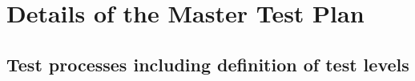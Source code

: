 \chapter{Details of the Master Test Plan} \label{chp:details-of-the-master-test-plan}
	\begin{comment}
		$<$Introduce the following subordinate sections. This section describes the test processes, test documentation requirements, and test reporting requirements for the entire test effort. $>$
	\end{comment}

\section{Test processes including definition of test levels} \label{s:details-of-the-master-test-plan:test-processes-including-definition-of-test-levels}
	\begin{comment}
		$<$ Identify test activities and tasks to be performed for each of the test processes described in Clause 5 of this standard (or the alternative test processes defined by the user of this standard), and document those test activities and tasks. Provide an overview of the test activities and tasks for all development life cycle processes. Identify the number and sequence of levels of test. There may be a different number of levels than the example used in this standard (component, component integration, system, and acceptance). Integration is often accomplished through a series of test levels, for both component integration and systems integration. Examples of possible additional test levels include security, usability, performance, stress, recovery, and regression. Small systems may have fewer levels of test, e.g., combining system and acceptance. If the test processes are already defined by an organization’s standards, a reference to those standards could be substituted for the contents of this subclause.$>$
	\end{comment}


